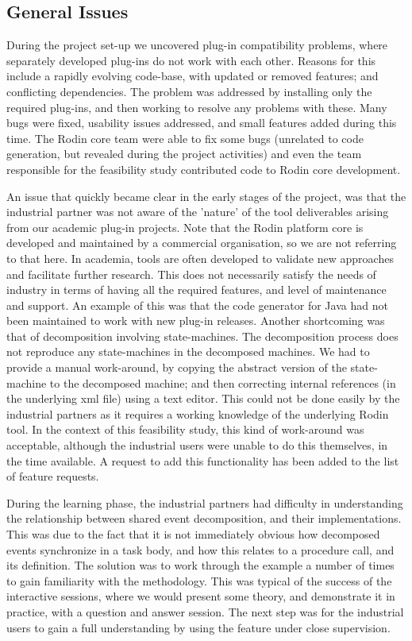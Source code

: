 \documentclass{llncs}%
\begin{document}
\subsection{General Issues} During the project set-up we uncovered plug-in compatibility problems, where separately developed plug-ins do not work with each other. Reasons for this include a rapidly evolving code-base, with updated or removed features; and conflicting dependencies. The problem was addressed by installing only the required plug-ins, and then working to resolve any problems with these. Many bugs were fixed, usability issues addressed, and small features added during this time.  The Rodin core team were able to fix some bugs (unrelated to code generation, but revealed during the project activities) and even the team responsible for the feasibility study contributed code to Rodin core development. 

An issue that quickly became clear in the early stages of the project, was that the industrial partner was not aware of the 'nature' of the tool deliverables arising from our academic plug-in projects. Note that the Rodin platform core is developed and maintained by a commercial organisation, so we are not referring to that here. In academia, tools are often developed to validate new approaches and facilitate further research. This does not necessarily satisfy the needs of industry in terms of having all the required features, and  level of maintenance and support. An example of this was that the code generator for Java had not been maintained to work with new plug-in releases. Another shortcoming was that of decomposition involving state-machines. The decomposition process does not reproduce any state-machines in the decomposed machines. We had to provide a manual work-around, by copying the abstract version of the state-machine to the decomposed machine; and then correcting internal references (in the underlying xml file) using a text editor. This could not be done easily by the industrial partners as it requires a working knowledge of the underlying Rodin tool. In the context of this feasibility study, this kind of work-around was acceptable, although the industrial users were unable to do this themselves, in the time available. A request to add this functionality has been added to the list of feature requests. 
 
During the learning phase, the industrial partners had difficulty in understanding the relationship between shared event decomposition, and their implementations. This was due to the fact that it is not immediately obvious how decomposed events synchronize in a task body, and how this relates to a procedure call, and its definition. The solution was to work through the example a number of times to gain familiarity with the methodology. This was typical of the success of the interactive sessions, where we would present some theory, and demonstrate it in practice, with a question and answer session. The next step was for the industrial users to gain a full understanding by using the feature under close supervision.
\end{document}
